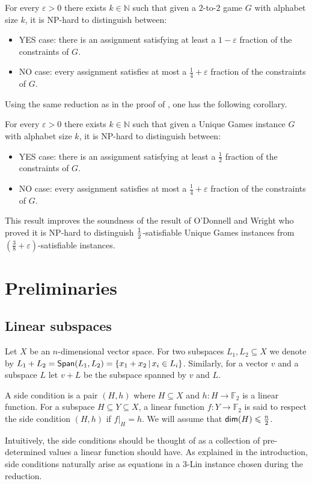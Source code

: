 \documentclass{toc}
\newcommand\half{{1\over2}}
\newcommand\Set[2]{ \left\{ #1 \,  \vert  \, #2\right\} }
\newcommand\spn{{\sf Span}}
\newcommand\eps{\varepsilon}
\renewcommand\leq{\leqslant}
\renewcommand\subset{\subseteq}
\def\F{\mathbb{F}}
\begin{document}
\begin{theorem}
For every $\eps>0$ there exists $k\in\mathbb{N}$ such that given a $2$-to-$2$ game $G$ with alphabet size $k$, it
is NP-hard to distinguish between:
\begin{itemize}
  \item YES case: there is an assignment satisfying at least
  a %
  $1-\eps$ fraction of the constraints of $G$.
  \item NO case: every assignment satisfies at most
  a %
  $\frac{1}{4}+\eps$ fraction of the constraints of $G$.
\end{itemize}
\end{theorem}


Using the same reduction as in the proof of , one has the following corollary.
\begin{corollary}
For every $\eps>0$ there exists $k\in\mathbb{N}$ such that given a Unique Games instance $G$ with alphabet size $k$, it
is NP-hard to distinguish between:
\begin{itemize}
  \item YES case: there is an assignment satisfying at least
  a %
  $\frac{1}{2}$ fraction of the constraints of $G$.
  \item NO case: every assignment satisfies at most
  a %
  $\frac{1}{4}+\eps$ fraction of the constraints of $G$.
\end{itemize}
\end{corollary}
This result improves the soundness of the result of
%
O'Donnell
and Wright \cite{OW12} who proved it is NP-hard
to distinguish $\half$-satisfiable Unique Games instances from $\left(\frac{3}{8}+\eps\right)$-satisfiable instances.
\section{Preliminaries}

\subsection{Linear subspaces}

Let $X$ be an $n$-dimensional vector space. For two subspaces $L_1,L_2\subset X$ we denote by $L_1 + L_2 = \spn(L_1,L_2) = \Set{x_1+x_2 }{ x_i\in L_i}$. Similarly, for a vector $v$ and a subspace $L$ let $v+L$ be the subspace spanned by $v$ and $L$.

%
%
%

%
\begin{definition}  %
A side condition is a pair $(H, h)$ where $H \subseteq X$ and $h: H \to\F_2$ is a linear
function. For a subspace $H \subseteq Y \subseteq X$,
a linear function $f: Y \to\F_2$ is said to respect the side condition $(H, h)$ if $f|_H =h$.
We will assume that $ {\sf dim}(H) \leq \frac{n}{2}$.
\end{definition}
Intuitively, the side conditions should be thought of as a collection of pre-determined values a linear function should have. As explained in
the introduction, side conditions naturally arise as equations in a $3$-Lin instance chosen during the reduction.
%
\end{document}
